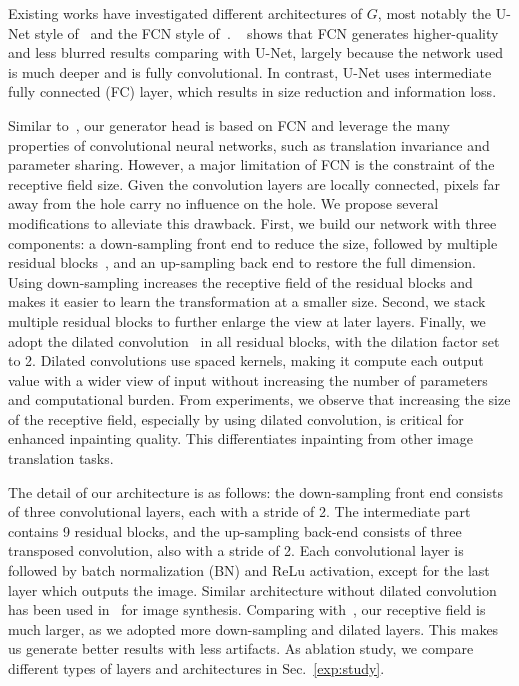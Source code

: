 Existing works have investigated different architectures of $G$, most notably the U-Net style of~\cite{pathak2016context} and the FCN style of~\cite{iizuka2017globally}. ~\cite{iizuka2017globally} shows that FCN generates higher-quality and less blurred results comparing with U-Net, largely because the network used is much deeper and is fully convolutional. In contrast, U-Net uses intermediate fully connected (FC) layer, which results in size reduction and information loss. 

Similar to~\cite{iizuka2017globally}, our generator head is based on FCN and leverage the many properties of convolutional neural networks, such as translation invariance and parameter sharing. However, a major limitation of FCN is the constraint of the receptive field size. Given the convolution layers are locally connected, pixels far away from the hole carry no influence on the hole. We propose several modifications to alleviate this drawback. First, we build our network with three components: a down-sampling front end to reduce the size, followed by multiple residual blocks~\cite{he2016deep}, and an up-sampling back end to restore the full dimension. Using down-sampling increases the receptive field of the residual blocks and makes it easier to learn the transformation at a smaller size. Second, we stack multiple residual blocks to further enlarge the view at later layers. Finally, we adopt the dilated convolution~\cite{yu2015multi} in all residual blocks, with the dilation factor set to 2. Dilated convolutions use spaced kernels, making it compute each output value with a wider view of input without increasing the number of parameters and computational burden. From experiments, we observe that increasing the size of the receptive field, especially by using dilated convolution, is critical for enhanced inpainting quality. This differentiates inpainting from other image translation tasks.

The detail of our architecture is as follows: the down-sampling front end consists of three convolutional layers, each with a stride of 2. The intermediate part contains 9 residual blocks, and the up-sampling back-end consists of three transposed convolution, also with a stride of 2. Each convolutional layer is followed by batch normalization (BN) and ReLu activation, except for the last layer which outputs the image. Similar architecture without dilated convolution has been used in~\cite{wang2017high} for image synthesis. Comparing with~\cite{iizuka2017globally}, our receptive field is much larger, as we adopted more down-sampling and dilated layers. This makes us generate better results with less artifacts. As ablation study, we compare different types of layers and architectures in Sec.~\ref{exp:study}.

